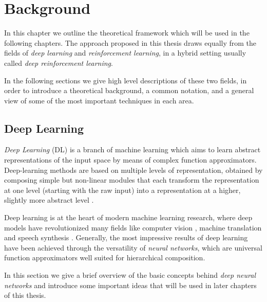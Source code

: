 \chapter{Background}
\label{chapter2_background}
\thispagestyle{empty}

\vspace{0.5cm}

In this chapter we outline the theoretical framework which will be 
used in the following chapters. The approach proposed in this thesis draws 
equally from the fields of \textit{deep learning} and 
\textit{reinforcement learning}, in a hybrid setting usually called 
\textit{deep reinforcement learning}.

In the following sections we give high level descriptions of these two fields, 
in order to introduce a theoretical background, a common notation, and a general
view of some of the most important techniques in each area. 

\section{Deep Learning} \label{s:DL}
\textit{Deep Learning} (DL) is a branch of machine learning which aims to learn
abstract representations of the input space by means of complex function 
approximators.  Deep-learning methods are based on multiple levels of 
representation, obtained by composing simple but non-linear modules that each 
transform the representation at one level (starting with the raw input) into a 
representation at a higher, slightly more abstract level \cite{lecun2015deep}.

Deep learning is at the heart of modern machine learning research, where deep 
models have revolutionized many fields like computer vision 
\cite{krizhevsky2012imagenet, szegedy2015going}, machine translation 
\cite{wu2016google} and speech synthesis \cite{vanwavenet}.
Generally, the most impressive results of deep learning have been achieved 
through the versatility of \textit{neural networks}, which are universal 
function approximators well suited for hierarchical composition.

In this section we give a brief overview of the basic concepts behind 
\textit{deep neural networks }and introduce some important ideas that will be 
used in later chapters of this thesis.

